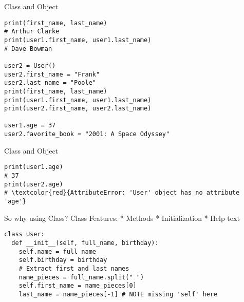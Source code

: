 \documentclass{beamer}
\begin{document}
\begin{frame}[fragile]{Class and Object}
\begin{verbatim}
print(first_name, last_name)
# Arthur Clarke
print(user1.first_name, user1.last_name)
# Dave Bowman

user2 = User()
user2.first_name = "Frank"
user2.last_name = "Poole"
print(first_name, last_name)
print(user1.first_name, user1.last_name)
print(user2.first_name, user2.last_name)

user1.age = 37
user2.favorite_book = "2001: A Space Odyssey"
\end{verbatim}
\end{frame}

\begin{frame}[fragile]{Class and Object}
\begin{verbatim}
print(user1.age)
# 37
print(user2.age)
# \textcolor{red}{AttributeError: 'User' object has no attribute 'age'}
\end{verbatim}
So why using Class? Class Features: * Methods * Initialization 
* Help text
\begin{verbatim}
class User:
  def __init__(self, full_name, birthday):
    self.name = full_name
    self.birthday = birthday
    # Extract first and last names
    name_pieces = full_name.split(" ")
    self.first_name = name_pieces[0]
    last_name = name_pieces[-1] # NOTE missing 'self' here
\end{verbatim}
\end{frame}
\end{document}
